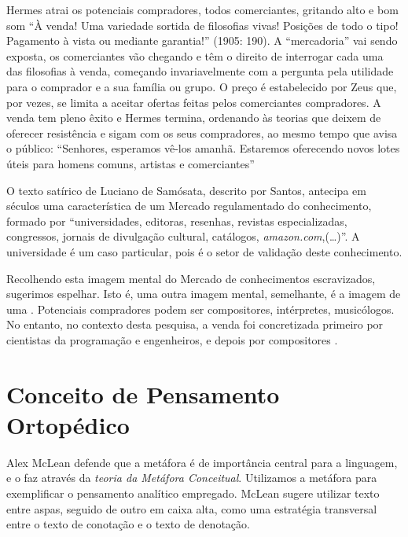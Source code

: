 \begin{citacao}
Hermes atrai os potenciais compradores, todos comerciantes, gritando alto e bom som “À venda! Uma variedade sortida de filosofias vivas! Posições de todo o tipo! Pagamento à vista ou mediante garantia!” (1905: 190). A “mercadoria” vai sendo exposta, os comerciantes vão chegando e têm o direito de interrogar cada uma das filosofias à venda, começando invariavelmente com a pergunta pela utilidade para o comprador e a sua família ou grupo. O preço é estabelecido por Zeus que, por vezes, se limita a aceitar ofertas feitas pelos comerciantes compradores. A venda tem pleno êxito e Hermes termina, ordenando às teorias que deixem de oferecer resistência e sigam com os seus compradores, ao mesmo tempo que avisa o público: “Senhores, esperamos vê-los amanhã. Estaremos oferecendo novos lotes úteis para homens comuns, artistas e comerciantes”   
\end{citacao}

O texto satírico de Luciano de Samósata, descrito por Santos, antecipa em séculos uma característica de um Mercado regulamentado do conhecimento, formado por ``universidades, editoras, resenhas, revistas especializadas, congressos, jornais de divulgação cultural, catálogos, \emph{amazon.com},(\ldots)''\cite[p.~12--13]{santos_filosofia_2008}. A universidade é um caso particular, pois é o setor de validação deste conhecimento.  

Recolhendo esta imagem mental do Mercado de conhecimentos escravizados, sugerimos espelhar. Isto é, uma outra imagem mental, semelhante, é a imagem de uma . Potenciais compradores podem ser compositores, intérpretes, musicólogos. No entanto, no contexto desta pesquisa, a venda foi concretizada primeiro por cientistas da programação e engenheiros, e depois por compositores \cite{mathews_digital_1963,mathews_technology_1969,mathews_groove_1970,roads_interview_1980,park_interview_2009}.


\section*{Conceito de Pensamento Ortopédico}

Alex McLean defende que a metáfora é de importância central para a linguagem, e o faz através da \emph{teoria da Metáfora Conceitual}. Utilizamos a metáfora para exemplificar o pensamento analítico empregado. McLean sugere utilizar texto entre aspas, seguido de outro em caixa alta, como uma estratégia transversal entre o texto de conotação e o texto de denotação.

